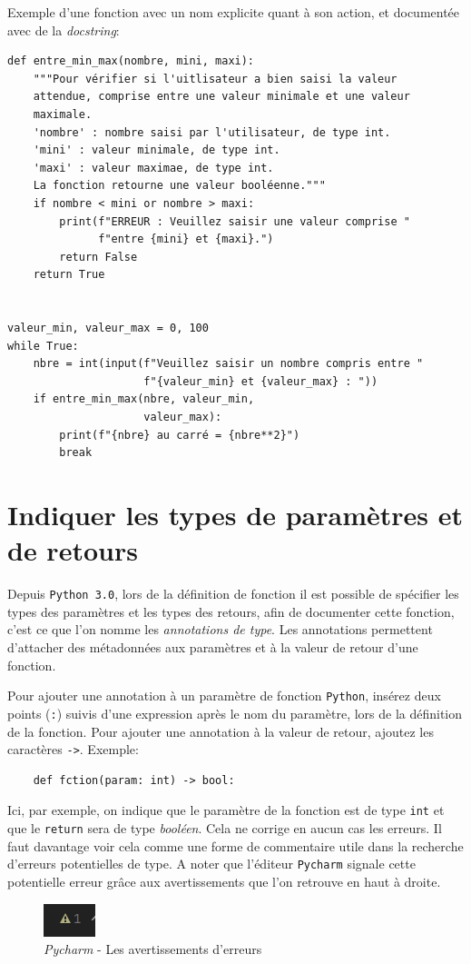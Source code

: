 \documentclass[a4paper,11pt]{book}
\begin{document}
Exemple d'une fonction avec un nom explicite quant à son action, et documentée avec de la \textit{docstring}:
\begin{lstlisting}[caption=Exemple d'une fonction avec une \textit{docstring}]
def entre_min_max(nombre, mini, maxi):
    """Pour vérifier si l'uitlisateur a bien saisi la valeur 
    attendue, comprise entre une valeur minimale et une valeur 
    maximale.
    'nombre' : nombre saisi par l'utilisateur, de type int.
    'mini' : valeur minimale, de type int.
    'maxi' : valeur maximae, de type int.
    La fonction retourne une valeur booléenne."""
    if nombre < mini or nombre > maxi:
        print(f"ERREUR : Veuillez saisir une valeur comprise "
              f"entre {mini} et {maxi}.")
        return False
    return True


valeur_min, valeur_max = 0, 100
while True:
    nbre = int(input(f"Veuillez saisir un nombre compris entre "
                     f"{valeur_min} et {valeur_max} : "))
    if entre_min_max(nbre, valeur_min,
                     valeur_max):
        print(f"{nbre} au carré = {nbre**2}")
        break
\end{lstlisting}
\medskip

\section{Indiquer les types de paramètres et de retours}\label{annotation_types}
Depuis \texttt{Python 3.0}, lors de la définition de fonction il est possible de spécifier les types des paramètres et les types des retours, afin de documenter cette fonction, c'est ce que l'on nomme les \textit{annotations de type}. Les annotations permettent d'attacher des métadonnées aux paramètres et à la valeur de retour d'une fonction.
\medskip

Pour ajouter une annotation à un paramètre de fonction \texttt{Python}, insérez deux points (\texttt{:}) suivis d'une expression après le nom du paramètre, lors de la définition de la fonction. Pour ajouter une annotation à la valeur de retour, ajoutez les caractères \og \texttt{->}\fg{}. Exemple:
\begin{verbatim}
    def fction(param: int) -> bool:
\end{verbatim}
\medskip

Ici, par exemple, on indique que le paramètre de la fonction est de type \texttt{int} et que le \texttt{return} sera de type \textit{booléen}. Cela ne corrige en aucun cas les erreurs. Il faut davantage voir cela comme une forme de commentaire utile dans la recherche d'erreurs potentielles de type. A noter que l'éditeur \texttt{Pycharm} signale cette potentielle erreur grâce aux avertissements que l'on retrouve en haut à droite.
\begin{figure}[h]
\begin{center}
\includegraphics[scale=0.6]{IMG/Pycharm-11.png}
\caption{\textit{Pycharm} - Les avertissements d'erreurs}
\end{center}
\end{figure}
\medskip
\end{document}
